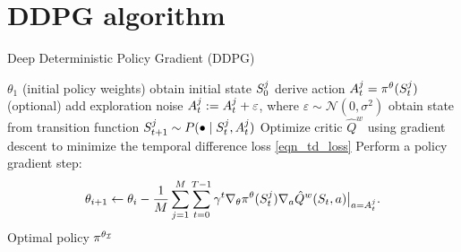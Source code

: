 \documentclass[12pt,twoside]{../../mitthesis}
\begin{document}
\section*{DDPG algorithm}
\begin{algorithm}
    \caption{Deep Deterministic Policy Gradient (DDPG)}
    \label{alg:my-alg}
    \begin{algorithmic}[1]
     $\theta_1$ (initial policy weights)
            \STATE obtain initial state $S_0^{j}$
                \STATE derive action $A_t^j = \pi^{\theta}( S_t^{j})$
                \STATE (optional) add exploration noise $A_t^j:= A_t^j + \varepsilon$, where $\varepsilon\sim\mathcal{N}(0, \sigma^2)$ 
                \STATE obtain state from transition function $S_{t+1}^j \sim P(\bullet \mid S_t^j, A_t^j)$
            \ENDFOR
        \ENDFOR
        \STATE Optimize critic $\hat Q^{w}$ using gradient descent to minimize the temporal difference loss \eqref{eqn_td_loss}
        \STATE Perform a policy gradient step:
        $$
            \theta_{i+1} \leftarrow \theta_i - \frac{1}{M} \sum_{j = 1}^M \sum_{t=0}^{T-1} \gamma ^ t \nabla_{\theta}\pi^{\theta}(S_t^j)\nabla_{a} \hat Q^{w}(S_t, a)\big\rvert_{a = A_t^j}.
        $$
    \ENDFOR
    \STATE \RETURN Optimal policy $\pi^{\theta_{\mathcal I}}$
    \end{algorithmic}
\end{algorithm}
\end{document}
